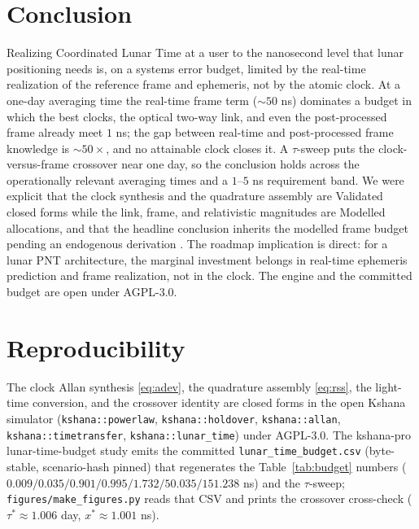 \documentclass[conference]{IEEEtran}
\begin{document}
\section{Conclusion}
Realizing Coordinated Lunar Time at a user to the nanosecond level that lunar
positioning needs is, on a systems error budget, limited by the real-time
realization of the reference frame and ephemeris, not by the atomic clock. At a
one-day averaging time the real-time frame term ($\sim$$50$ ns) dominates a budget
in which the best clocks, the optical two-way link, and even the post-processed
frame already meet $1$ ns; the gap between real-time and post-processed frame
knowledge is $\sim$$50\times$, and no attainable clock closes it. A $\tau$-sweep puts
the clock-versus-frame crossover near one day, so the conclusion holds across the
operationally relevant averaging times and a $1$--$5$ ns requirement band. We were
explicit that the clock synthesis and the quadrature assembly are Validated closed
forms while the link, frame, and relativistic magnitudes are Modelled allocations,
and that the headline conclusion inherits the modelled frame budget pending an
endogenous derivation \cite{baweja2026eop}. The roadmap implication is direct: for a
lunar PNT architecture, the marginal investment belongs in real-time ephemeris
prediction and frame realization, not in the clock. The engine and the committed
budget are open under AGPL-3.0.

\section*{Reproducibility}
The clock Allan synthesis \eqref{eq:adev}, the quadrature assembly \eqref{eq:rss},
the light-time conversion, and the crossover identity are closed forms in the open
Kshana simulator \cite{kshana} (\texttt{kshana::powerlaw}, \texttt{kshana::holdover},
\texttt{kshana::allan}, \texttt{kshana::timetransfer}, \texttt{kshana::lunar\_time})
under AGPL-3.0. The kshana-pro lunar-time-budget study emits the committed
\texttt{lunar\_time\_budget.csv} (byte-stable, scenario-hash pinned) that
regenerates the Table~\ref{tab:budget} numbers
($0.009/0.035/0.901/0.995/1.732/50.035/151.238$ ns) and the $\tau$-sweep;
\texttt{figures/make\_figures.py} reads that CSV and prints the crossover
cross-check ($\tau^\ast\approx1.006$ day, $x^\ast\approx1.001$ ns).
\end{document}
